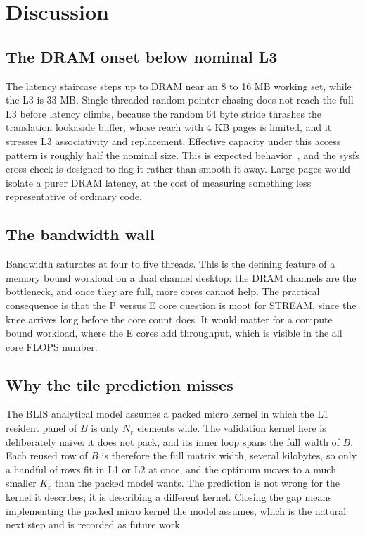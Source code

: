 \chapter{Discussion}

\section{The DRAM onset below nominal L3}

The latency staircase steps up to DRAM near an 8 to 16 MB working set, while the
L3 is 33 MB. Single threaded random pointer chasing does not reach the full L3
before latency climbs, because the random 64 byte stride thrashes the
translation lookaside buffer, whose reach with 4 KB pages is limited, and it
stresses L3 associativity and replacement. Effective capacity under this access
pattern is roughly half the nominal size. This is expected
behavior~\cite{drepper2007}, and the sysfs cross check is designed to flag it
rather than smooth it away. Large pages would isolate a purer DRAM latency, at
the cost of measuring something less representative of ordinary code.

\section{The bandwidth wall}

Bandwidth saturates at four to five threads. This is the defining feature of a
memory bound workload on a dual channel desktop: the DRAM channels are the
bottleneck, and once they are full, more cores cannot help. The practical
consequence is that the P versus E core question is moot for STREAM, since the
knee arrives long before the core count does. It would matter for a compute
bound workload, where the E cores add throughput, which is visible in the all
core FLOPS number.

\section{Why the tile prediction misses}

The BLIS analytical model assumes a packed micro kernel in which the L1 resident
panel of $B$ is only $N_r$ elements wide. The validation kernel here is
deliberately naive: it does not pack, and its inner loop spans the full width of
$B$. Each reused row of $B$ is therefore the full matrix width, several
kilobytes, so only a handful of rows fit in L1 or L2 at once, and the optimum
moves to a much smaller $K_c$ than the packed model wants. The prediction is not
wrong for the kernel it describes; it is describing a different kernel. Closing
the gap means implementing the packed micro kernel the model assumes, which is
the natural next step and is recorded as future work.

